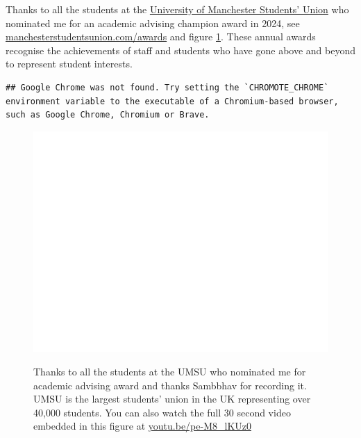 \documentclass[
  12pt,
]{book}
\begin{document}
Thanks to all the students at the \href{https://en.wikipedia.org/wiki/University_of_Manchester_Students\%27_Union}{University of Manchester Students' Union} who nominated me for an academic advising champion award in 2024, see \href{https://manchesterstudentsunion.com/awards}{manchesterstudentsunion.com/awards} and figure \ref{fig:su-fig}. These annual awards recognise the achievements of staff and students who have gone above and beyond to represent student interests. \citep{su2024}

\begin{verbatim}
## Google Chrome was not found. Try setting the `CHROMOTE_CHROME` environment variable to the executable of a Chromium-based browser, such as Google Chrome, Chromium or Brave.
\end{verbatim}

\begin{figure}

{\centering \href{https://www.youtube.com/embed/pe-M8_lKUz0}{\includegraphics[width=0.99\linewidth]{duncan-hull_files/figure-latex/su-fig-1} }

}

\caption{Thanks to all the students at the UMSU who nominated me for academic advising award and thanks Sambbhav for recording it. UMSU is the largest students' union in the UK representing over 40,000 students. You can also watch the full 30 second video embedded in this figure at \href{https://youtu.be/pe-M8_lKUz0}{youtu.be/pe-M8\_lKUz0} \citep{youtube-su2024}}\label{fig:su-fig}
\end{figure}
\end{document}

